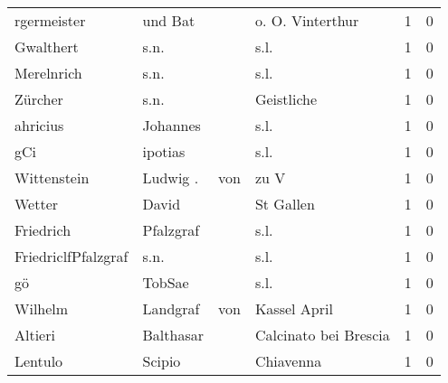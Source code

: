\begin{center}
\begin{tiny}
\begin{longtabu}{llllrr}
              rgermeister &                            und Bat &             &                            o. O. Vinterthur &          1 &         0 \\
                Gwalthert &                               s.n. &             &                                        s.l. &          1 &         0 \\
               Merelnrich &                               s.n. &             &                                        s.l. &          1 &         0 \\
                  Zürcher &                               s.n. &             &                                  Geistliche &          1 &         0 \\
                 ahricius &                           Johannes &             &                                        s.l. &          1 &         0 \\
                      gCi &                            ipotias &             &                                        s.l. &          1 &         0 \\
              Wittenstein &                           Ludwig . &         von &                                        zu V &          1 &         0 \\
                   Wetter &                              David &             &                                   St Gallen &          1 &         0 \\
                Friedrich &                          Pfalzgraf &             &                                        s.l. &          1 &         0 \\
      FriedriclfPfalzgraf &                               s.n. &             &                                        s.l. &          1 &         0 \\
                       gö &                             TobSae &             &                                        s.l. &          1 &         0 \\
                  Wilhelm &                           Landgraf &         von &                                Kassel April &          1 &         0 \\
                  Altieri &                          Balthasar &             &                       Calcinato bei Brescia &          1 &         0 \\
                  Lentulo &                             Scipio &             &                                   Chiavenna &          1 &         0 \\

\end{longtabu}
\end{tiny}
\end{center}
